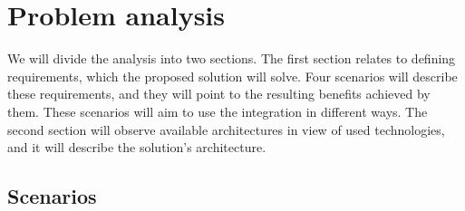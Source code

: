 \chapter{Problem analysis}

We will divide the analysis into two sections.
The first section relates to defining requirements, which the proposed solution will solve.
Four scenarios will describe these requirements, and they will point to the resulting benefits achieved by them.
These scenarios will aim to use the integration in different ways.
The second section will observe available architectures in view of used technologies, and it will describe the solution's architecture.

\section{Scenarios}

